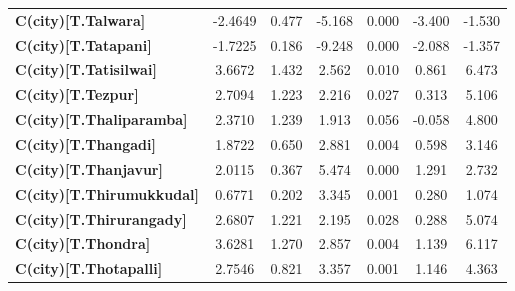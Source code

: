 \begin{center}
\begin{tabular}{lcccccc}
\textbf{C(city)[T.Talwara]}                                                                         &      -2.4649  &        0.477     &    -5.168  &         0.000        &       -3.400    &       -1.530     \\
\textbf{C(city)[T.Tatapani]}                                                                        &      -1.7225  &        0.186     &    -9.248  &         0.000        &       -2.088    &       -1.357     \\
\textbf{C(city)[T.Tatisilwai]}                                                                      &       3.6672  &        1.432     &     2.562  &         0.010        &        0.861    &        6.473     \\
\textbf{C(city)[T.Tezpur]}                                                                          &       2.7094  &        1.223     &     2.216  &         0.027        &        0.313    &        5.106     \\
\textbf{C(city)[T.Thaliparamba]}                                                                    &       2.3710  &        1.239     &     1.913  &         0.056        &       -0.058    &        4.800     \\
\textbf{C(city)[T.Thangadi]}                                                                        &       1.8722  &        0.650     &     2.881  &         0.004        &        0.598    &        3.146     \\
\textbf{C(city)[T.Thanjavur]}                                                                       &       2.0115  &        0.367     &     5.474  &         0.000        &        1.291    &        2.732     \\
\textbf{C(city)[T.Thirumukkudal]}                                                                   &       0.6771  &        0.202     &     3.345  &         0.001        &        0.280    &        1.074     \\
\textbf{C(city)[T.Thirurangady]}                                                                    &       2.6807  &        1.221     &     2.195  &         0.028        &        0.288    &        5.074     \\
\textbf{C(city)[T.Thondra]}                                                                         &       3.6281  &        1.270     &     2.857  &         0.004        &        1.139    &        6.117     \\
\textbf{C(city)[T.Thotapalli]}                                                                      &       2.7546  &        0.821     &     3.357  &         0.001        &        1.146    &        4.363     \\

\end{tabular}
\end{center}
